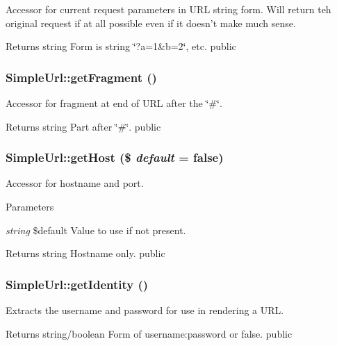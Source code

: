 \label{class_simple_url_a902d795b570581c345a9cb1018db2f82}
Accessor for current request parameters in URL string form. Will return teh original request if at all possible even if it doesn't make much sense. \begin{DoxyReturn}{Returns}
string Form is string \char`\"{}?a=1\&b=2\char`\"{}, etc.  public 
\end{DoxyReturn}
\hypertarget{class_simple_url_ad0c87b70e537cc749dc4f7663efc88a7}{
\subsubsection[{getFragment}]{\setlength{\rightskip}{0pt plus 5cm}SimpleUrl::getFragment ()}}
\label{class_simple_url_ad0c87b70e537cc749dc4f7663efc88a7}
Accessor for fragment at end of URL after the \char`\"{}\#\char`\"{}. \begin{DoxyReturn}{Returns}
string Part after \char`\"{}\#\char`\"{}.  public 
\end{DoxyReturn}
\hypertarget{class_simple_url_ad2d630f807ac3818c59c51a76c447c73}{
\subsubsection[{getHost}]{\setlength{\rightskip}{0pt plus 5cm}SimpleUrl::getHost (\$ {\em default} = {\ttfamily false})}}
\label{class_simple_url_ad2d630f807ac3818c59c51a76c447c73}
Accessor for hostname and port. 
\begin{DoxyParams}{Parameters}
\item[{\em string}]\$default Value to use if not present. \end{DoxyParams}
\begin{DoxyReturn}{Returns}
string Hostname only.  public 
\end{DoxyReturn}
\hypertarget{class_simple_url_acde95c2b6cce0583b06854947603c048}{
\subsubsection[{getIdentity}]{\setlength{\rightskip}{0pt plus 5cm}SimpleUrl::getIdentity ()}}
\label{class_simple_url_acde95c2b6cce0583b06854947603c048}
Extracts the username and password for use in rendering a URL. \begin{DoxyReturn}{Returns}
string/boolean Form of username:password or false.  public 
\end{DoxyReturn}
